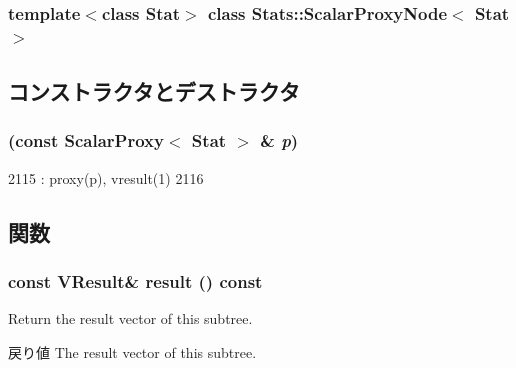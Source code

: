 \subsubsection*{template$<$class Stat$>$ class Stats::ScalarProxyNode$<$ Stat $>$}



\subsection{コンストラクタとデストラクタ}
\hypertarget{classStats_1_1ScalarProxyNode_aaaa8b262149b18fc4951b6be48ba1fdc}{
\subsubsection[{ScalarProxyNode}]{ (const {\bf ScalarProxy}$<$ Stat $>$ \& {\em p})}}
\label{classStats_1_1ScalarProxyNode_aaaa8b262149b18fc4951b6be48ba1fdc}



\begin{DoxyCode}
2115         : proxy(p), vresult(1)
2116     { }
\end{DoxyCode}


\subsection{関数}
\hypertarget{classStats_1_1ScalarProxyNode_aba312f9e3431b1652f8b3ddf3fe105dc}{
\subsubsection[{result}]{\setlength{\rightskip}{0pt plus 5cm}const {\bf VResult}\& result () const}}
\label{classStats_1_1ScalarProxyNode_aba312f9e3431b1652f8b3ddf3fe105dc}
Return the result vector of this subtree. \begin{DoxyReturn}{戻り値}
The result vector of this subtree. 
\end{DoxyReturn}


